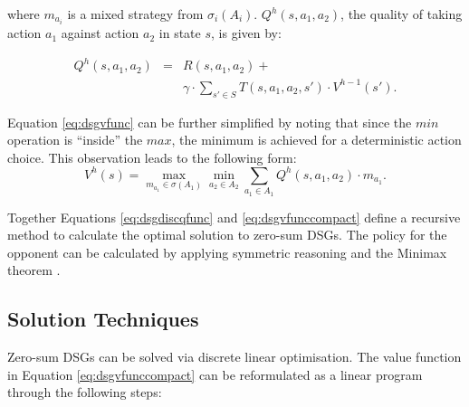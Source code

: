 where $m_{a_i}$ is a mixed strategy from $\sigma_i(A_i)$. 
$Q^{h}(s, a_1, a_2)$, the quality of taking action $a_1$ against action $a_2$ in state $s$,
is given by:

{\small 
\begin{eqnarray}
\label{eq:dsgdiscqfunc}
  Q^{h}(s, a_1, a_2) &=& R(s, a_1, a_2) + \nonumber \\
  && \gamma \cdot \sum_{s' \in S} T(s, a_1, a_2, s') \cdot V^{h-1}(s').
\end{eqnarray}
}%

Equation \eqref{eq:dsgvfunc} can be further simplified by noting that
since the $min$ operation is ``inside'' the $max$, the minimum is achieved
for a deterministic action choice. This observation leads to the following
form:
{\small 
\begin{equation}
\label{eq:dsgvfunccompact}
  V^{h}(s) = \max_{m_{a_{1}} \in \sigma(A_1)} \min_{a_2 \in A_2} \sum_{a_1 \in A_1} Q^{h}(s, a_1, a_2) \cdot m_{a_1}.
\end{equation}
}%

Together Equations \eqref{eq:dsgdiscqfunc} and \eqref{eq:dsgvfunccompact}
define a recursive method to calculate the optimal solution to zero-sum
DSGs. The policy for the opponent can be calculated by applying symmetric
reasoning and the Minimax theorem \cite{Neumann_MA_1928}. 

\subsection{Solution Techniques}
\label{subsec:dsgsolution}

Zero-sum DSGs can be solved via discrete linear optimisation. The value
function in Equation \eqref{eq:dsgvfunccompact} can be reformulated as a linear
program through the following steps:

